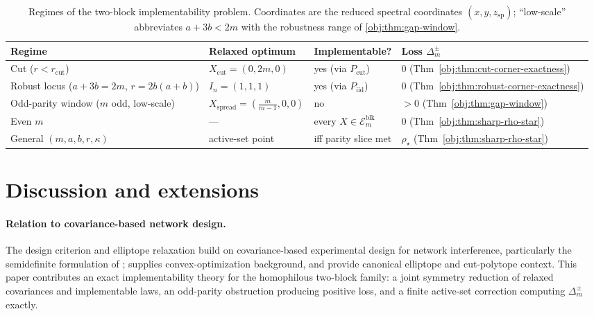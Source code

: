 \documentclass[11pt]{article}
\begin{document}
\begin{table}[h]
\centering
\begin{tabular}{llll}
\textbf{Regime} & \textbf{Relaxed optimum} & \textbf{Implementable?} & \textbf{Loss $\Delta_m^{\pm}$} \\
\hline
Cut ($r<r_{\mathrm{cut}}$) & $X_{\mathrm{cut}}=(0,2m,0)$ & yes (via $P_{\mathrm{cut}}$) & $0$ (Thm~\cref{obj:thm:cut-corner-exactness}) \\
Robust locus ($a+3b=2m$, $r=2b(a+b)$) & $I_n=(1,1,1)$ & yes (via $P_{\mathrm{iid}}$) & $0$ (Thm~\cref{obj:thm:robust-corner-exactness}) \\
Odd-parity window ($m$ odd, low-scale) & $X_{\mathrm{spread}}=(\tfrac{m}{m-1},0,0)$ & no & $>0$ (Thm~\cref{obj:thm:gap-window}) \\
Even $m$ & --- & every $X\in\mathcal E_m^{\mathrm{blk}}$ & $0$ (Thm~\cref{obj:thm:sharp-rho-star}) \\
General $(m,a,b,r,\kappa)$ & active-set point & iff parity slice met & $\rho_\star$ (Thm~\cref{obj:thm:sharp-rho-star}) \\
\end{tabular}
\caption{Regimes of the two-block implementability problem. Coordinates are the reduced spectral coordinates $(x,y,z_{\mathrm{sp}})$; ``low-scale'' abbreviates $a+3b<2m$ with the robustness range of \cref{obj:thm:gap-window}.}
\label{tab:regimes}
\end{table}


\section{Discussion and extensions}

\paragraph{Relation to covariance-based network design.} The design criterion and elliptope relaxation build on covariance-based experimental design for network interference, particularly the semidefinite formulation of \citet{thiyageswaran2026}; \citet{boyd2004} supplies convex-optimization background, and \citet{goemans1995,deza1997} provide canonical elliptope and cut-polytope context. This paper contributes an exact implementability theory for the homophilous two-block family: a joint symmetry reduction of relaxed covariances and implementable laws, an odd-parity obstruction producing positive loss, and a finite active-set correction computing \(\Delta_m^{\pm}\) exactly.
\end{document}

